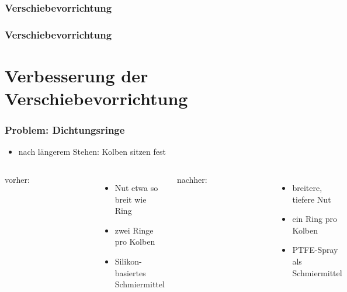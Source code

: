 \documentclass{beamer}
\begin{document}

	\begin{frame}
		\frametitle{Verschiebevorrichtung}
        \begin{figure}
            \centering
            
        \end{figure}
	\end{frame}


	\begin{frame}
		\frametitle{Verschiebevorrichtung}
        \begin{figure}
            \centering
            \resizebox{\textwidth}{!}{
                
            }
        \end{figure}
	\end{frame}

    \section{Verbesserung der Verschiebevorrichtung}


	\begin{frame}
		\frametitle{Problem: Dichtungsringe}
        \begin{itemize}
            \item 
                nach längerem Stehen: Kolben sitzen fest
        \end{itemize}
		\begin{columns}
			\column{0.5\textwidth}
            vorher:
            \begin{figure}
                \centering
                \resizebox{.9\textwidth}{!}{}
            \end{figure}
            \begin{itemize}
                \item 
                    Nut etwa so breit wie Ring
                \item
                    zwei Ringe pro Kolben
                \item
                    Silikon-basiertes Schmiermittel
            \end{itemize}
			\column{0.5\textwidth}
            nachher:
            \begin{figure}
                \centering
                \resizebox{.9\textwidth}{!}{}
            \end{figure}
            \begin{itemize}
                \item 
                    breitere, tiefere Nut
                \item
                    ein Ring pro Kolben
                \item
                    PTFE-Spray als Schmiermittel
            \end{itemize}
		\end{columns}
	\end{frame}
\end{document}
